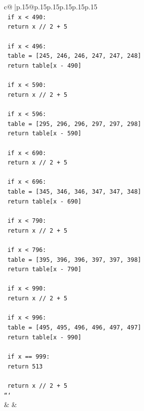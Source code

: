 \documentclass{article}
\begin{document}
{\begin{supertabular}{c@{$\;$}|p{.15\linewidth}@{}p{.15\linewidth}p{.15\linewidth}p{.15\linewidth}p{.15\linewidth}p{.15\linewidth}}
{{{\\ 
\texttt{    if x < 490:} \\
\texttt{        return x // 2 + 5} \\
\\ 
\texttt{    if x < 496:} \\
\texttt{        table = {[}245, 246, 246, 247, 247, 248{]}} \\
\texttt{        return table{[}x {-} 490{]}} \\
\\ 
\texttt{    if x < 590:} \\
\texttt{        return x // 2 + 5} \\
\\ 
\texttt{    if x < 596:} \\
\texttt{        table = {[}295, 296, 296, 297, 297, 298{]}} \\
\texttt{        return table{[}x {-} 590{]}} \\
\\ 
\texttt{    if x < 690:} \\
\texttt{        return x // 2 + 5} \\
\\ 
\texttt{    if x < 696:} \\
\texttt{        table = {[}345, 346, 346, 347, 347, 348{]}} \\
\texttt{        return table{[}x {-} 690{]}} \\
\\ 
\texttt{    if x < 790:} \\
\texttt{        return x // 2 + 5} \\
\\ 
\texttt{    if x < 796:} \\
\texttt{        table = {[}395, 396, 396, 397, 397, 398{]}} \\
\texttt{        return table{[}x {-} 790{]}} \\
\\ 
\texttt{    if x < 990:} \\
\texttt{        return x // 2 + 5} \\
\\ 
\texttt{    if x < 996:} \\
\texttt{        table = {[}495, 495, 496, 496, 497, 497{]}} \\
\texttt{        return table{[}x {-} 990{]}} \\
\\ 
\texttt{    if x == 999:} \\
\texttt{        return 513} \\
\\ 
\texttt{    return x // 2 + 5} \\
\texttt{```} \\
            }
        }
    }
    & & \\ \\


\end{supertabular}}
\end{document}

